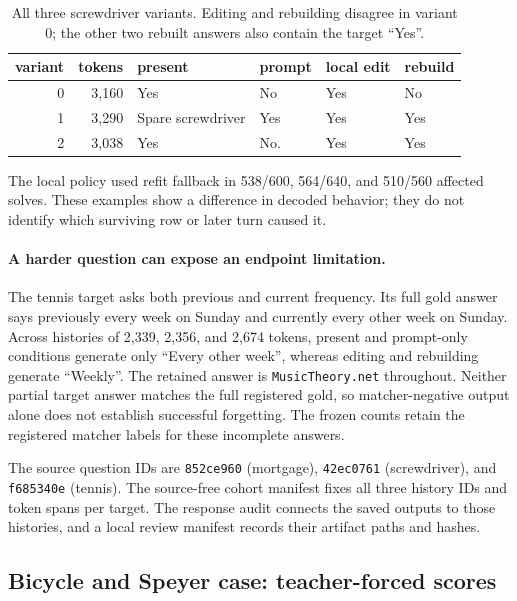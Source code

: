 \begin{table}[ht]
\centering\small
\caption{All three screwdriver variants. Editing and rebuilding disagree in
variant 0; the other two rebuilt answers also contain the target ``Yes''.}
\label{tab:screwdriver-variants}
\begin{tabular}{@{}rrllll@{}}
\toprule
variant & tokens & present & prompt & local edit & rebuild\\
\midrule
0 & 3,160 & Yes & No & Yes & No\\
1 & 3,290 & Spare screwdriver & Yes & Yes & Yes\\
2 & 3,038 & Yes & No. & Yes & Yes\\
\bottomrule
\end{tabular}
\end{table}
The local policy used refit fallback in 538/600, 564/640, and 510/560 affected
solves. These examples show a difference in decoded behavior; they do not
identify which surviving row or later turn caused it.

\paragraph{A harder question can expose an endpoint limitation.}
The tennis target asks both previous and current frequency. Its full gold
answer says previously every week on Sunday and currently every other week
on Sunday. Across histories of 2,339, 2,356, and 2,674 tokens, present and
prompt-only conditions generate only ``Every other week'', whereas editing
and rebuilding generate ``Weekly''. The retained answer is
\texttt{MusicTheory.net} throughout. Neither partial target answer matches
the full registered gold, so matcher-negative output alone does not establish
successful forgetting. The frozen counts retain the registered matcher
labels for these incomplete answers.

The source question IDs are \texttt{852ce960} (mortgage),
\texttt{42ec0761} (screwdriver), and \texttt{f685340e} (tennis).
The source-free cohort manifest fixes all three history IDs and token spans
per target. The response audit connects the saved outputs to those histories,
and a local review manifest records their artifact paths and hashes.

\subsection{Bicycle and Speyer case: teacher-forced scores}\label{app:bicycle-case}

